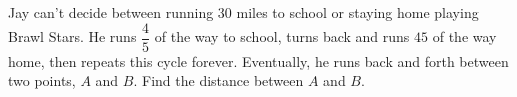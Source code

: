 Jay can't decide between running $30$ miles to school or staying home playing Brawl Stars. He runs $\dfrac{4}{5}$ of the way to school, turns back and runs $45$ of the way home, then repeats this cycle forever. Eventually, he runs back and forth between two points, $A$ and $B$. Find the distance between $A$ and $B$.
